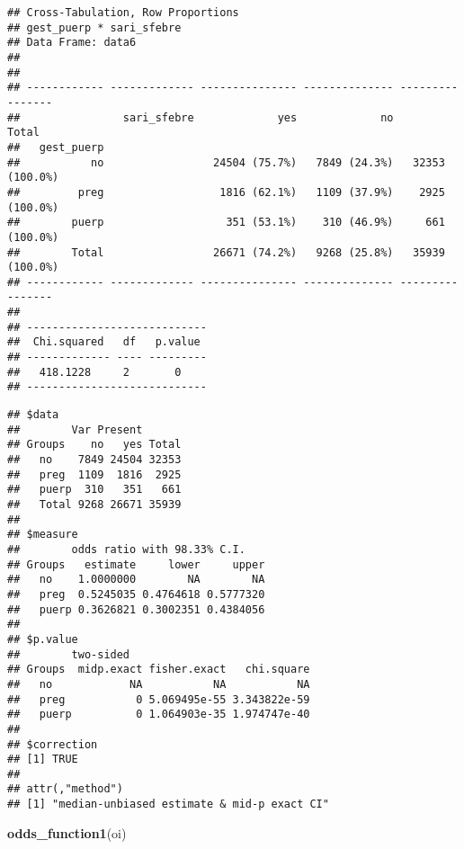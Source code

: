 \documentclass[
]{article}
\newenvironment{Shaded}{\begin{snugshade}}{\end{snugshade}}
\newcommand{\KeywordTok}[1]{\textcolor[rgb]{0.13,0.29,0.53}{\textbf{#1}}}
\newcommand{\NormalTok}[1]{#1}
\newcommand{\OperatorTok}[1]{\textcolor[rgb]{0.81,0.36,0.00}{\textbf{#1}}}
\newcommand{\StringTok}[1]{\textcolor[rgb]{0.31,0.60,0.02}{#1}}
\begin{document}
\begin{verbatim}
## Cross-Tabulation, Row Proportions  
## gest_puerp * sari_sfebre  
## Data Frame: data6  
## 
## 
## ------------ ------------- --------------- -------------- ----------------
##                sari_sfebre             yes             no            Total
##   gest_puerp                                                              
##           no                 24504 (75.7%)   7849 (24.3%)   32353 (100.0%)
##         preg                  1816 (62.1%)   1109 (37.9%)    2925 (100.0%)
##        puerp                   351 (53.1%)    310 (46.9%)     661 (100.0%)
##        Total                 26671 (74.2%)   9268 (25.8%)   35939 (100.0%)
## ------------ ------------- --------------- -------------- ----------------
## 
## ----------------------------
##  Chi.squared   df   p.value 
## ------------- ---- ---------
##   418.1228     2       0    
## ----------------------------
\end{verbatim}

\begin{Shaded}
\end{Shaded}

\begin{verbatim}
## $data
##        Var Present
## Groups    no   yes Total
##   no    7849 24504 32353
##   preg  1109  1816  2925
##   puerp  310   351   661
##   Total 9268 26671 35939
## 
## $measure
##        odds ratio with 98.33% C.I.
## Groups   estimate     lower     upper
##   no    1.0000000        NA        NA
##   preg  0.5245035 0.4764618 0.5777320
##   puerp 0.3626821 0.3002351 0.4384056
## 
## $p.value
##        two-sided
## Groups  midp.exact fisher.exact   chi.square
##   no            NA           NA           NA
##   preg           0 5.069495e-55 3.343822e-59
##   puerp          0 1.064903e-35 1.974747e-40
## 
## $correction
## [1] TRUE
## 
## attr(,"method")
## [1] "median-unbiased estimate & mid-p exact CI"
\end{verbatim}

\begin{Shaded}
\begin{Highlighting}[]
\KeywordTok{odds_function1}\NormalTok{(oi)}
\end{Highlighting}
\end{Shaded}
\end{document}
